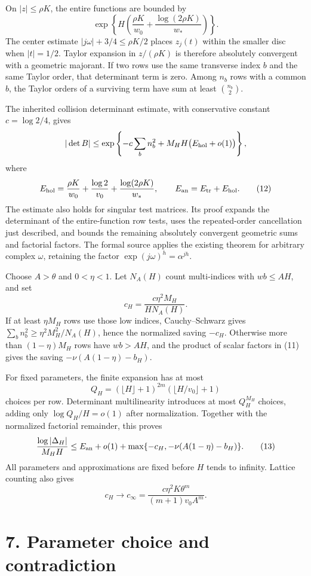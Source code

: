 \documentclass[11pt]{article}
\begin{document}
On \(|z|\le\rho K\), the entire functions are bounded by \[
\exp\left\{H\left(\frac{\rho K}{w_0}
+\frac{\log(2\rho K)}{w_*}\right)\right\}.
\] The center estimate \(|j\omega|+3/4\le\rho K/2\) places \(z_j(t)\)
within the smaller disc when \(|t|=1/2\). Taylor expansion in
\(z/(\rho K)\) is therefore absolutely convergent with a geometric
majorant. If two rows use the same transverse index \(b\) and the same
Taylor order, that determinant term is zero. Among \(n_b\) rows with a
common \(b\), the Taylor orders of a surviving term have sum at least
\(\binom{n_b}{2}\).

The inherited collision determinant estimate, with conservative constant
\(c=\log2/4\), gives \[
|\det B|\le\exp\left\{-c\sum_bn_b^2
+M_HH\bigl(E_{\rm hol}+o(1)\bigr)\right\},
\] where \[
E_{\rm hol}=\frac{\rho K}{w_0}+\frac{\log2}{v_0}
+\frac{\log(2\rho K)}{w_*},\qquad E_{\rm an}=E_{\rm tr}+E_{\rm hol}.
\tag{12}
\] The estimate also holds for singular test matrices. Its proof expands
the determinant of the entire-function row tests, uses the
repeated-order cancellation just described, and bounds the remaining
absolutely convergent geometric sums and factorial factors. The formal
source applies the existing theorem for arbitrary complex \(\omega\),
retaining the factor \(\exp(j\omega)^h=\alpha^{jh}\).

Choose \(A>\theta\) and \(0<\eta<1\). Let \(N_A(H)\) count multi-indices
with \(wb\le AH\), and set \[
c_H=\frac{c\eta^2M_H}{H N_A(H)}.
\] If at least \(\eta M_H\) rows use those low indices, Cauchy--Schwarz
gives \(\sum_bn_b^2\ge\eta^2M_H^2/N_A(H)\), hence the normalized saving
\(-c_H\). Otherwise more than \((1-\eta)M_H\) rows have \(wb>AH\), and
the product of scalar factors in (11) gives the saving
\(-\nu(A(1-\eta)-b_H)\).

For fixed parameters, the finite expansion has at most \[
Q_H=(\lfloor H\rfloor+1)^{2m}(\lfloor H/v_0\rfloor+1)
\] choices per row. Determinant multilinearity introduces at most
\(Q_H^{M_H}\) choices, adding only \(\log Q_H/H=o(1)\) after
normalization. Together with the normalized factorial remainder, this
proves \[
\frac{\log|\Delta_H|}{M_HH}
\le E_{\rm an}+o(1)+
\max\{-c_H,-\nu(A(1-\eta)-b_H)\}.
\tag{13}
\] All parameters and approximations are fixed before \(H\) tends to
infinity. Lattice counting also gives \[
c_H\longrightarrow c_\infty=
\frac{c\eta^2K\theta^m}{(m+1)v_0A^m}.
\tag{14}
\]

\section{7. Parameter choice and
contradiction}\label{parameter-choice-and-contradiction}
\end{document}
